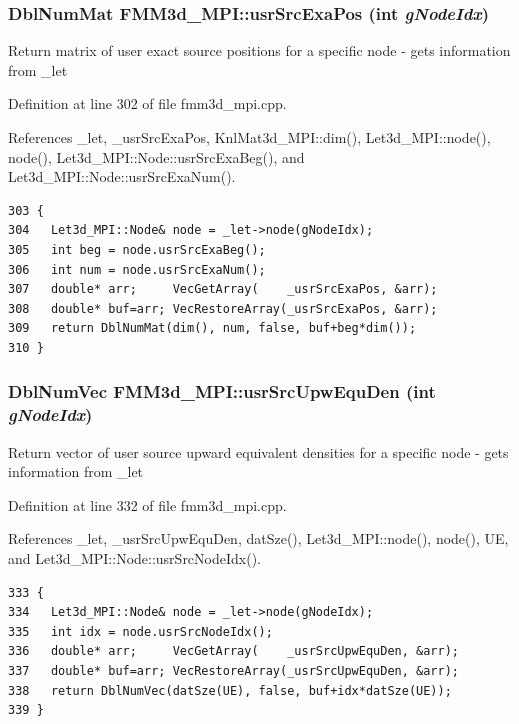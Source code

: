 \subsubsection{\setlength{\rightskip}{0pt plus 5cm}Dbl\-Num\-Mat FMM3d\_\-MPI::usr\-Src\-Exa\-Pos (int {\em g\-Node\-Idx})\hspace{0.3cm}{\tt  [protected]}}\label{classFMM3d__MPI_b26a762fb375fa319e068685c19d0661_b26a762fb375fa319e068685c19d0661}


Return matrix of user exact source positions for a specific node - gets information from \_\-let 

Definition at line 302 of file fmm3d\_\-mpi.cpp.

References \_\-let, \_\-usr\-Src\-Exa\-Pos, Knl\-Mat3d\_\-MPI::dim(), Let3d\_\-MPI::node(), node(), Let3d\_\-MPI::Node::usr\-Src\-Exa\-Beg(), and Let3d\_\-MPI::Node::usr\-Src\-Exa\-Num().

\footnotesize\begin{verbatim}303 {
304   Let3d_MPI::Node& node = _let->node(gNodeIdx);
305   int beg = node.usrSrcExaBeg();
306   int num = node.usrSrcExaNum();
307   double* arr;     VecGetArray(    _usrSrcExaPos, &arr);
308   double* buf=arr; VecRestoreArray(_usrSrcExaPos, &arr);
309   return DblNumMat(dim(), num, false, buf+beg*dim());
310 }
\end{verbatim}\normalsize 


\subsubsection{\setlength{\rightskip}{0pt plus 5cm}Dbl\-Num\-Vec FMM3d\_\-MPI::usr\-Src\-Upw\-Equ\-Den (int {\em g\-Node\-Idx})\hspace{0.3cm}{\tt  [protected]}}\label{classFMM3d__MPI_8bcb2429cdb899555517a31fd1bab896_8bcb2429cdb899555517a31fd1bab896}


Return vector of user source upward equivalent densities for a specific node - gets information from \_\-let 

Definition at line 332 of file fmm3d\_\-mpi.cpp.

References \_\-let, \_\-usr\-Src\-Upw\-Equ\-Den, dat\-Sze(), Let3d\_\-MPI::node(), node(), UE, and Let3d\_\-MPI::Node::usr\-Src\-Node\-Idx().

\footnotesize\begin{verbatim}333 {
334   Let3d_MPI::Node& node = _let->node(gNodeIdx);
335   int idx = node.usrSrcNodeIdx();
336   double* arr;     VecGetArray(    _usrSrcUpwEquDen, &arr);
337   double* buf=arr; VecRestoreArray(_usrSrcUpwEquDen, &arr);
338   return DblNumVec(datSze(UE), false, buf+idx*datSze(UE));
339 }
\end{verbatim}\normalsize 




